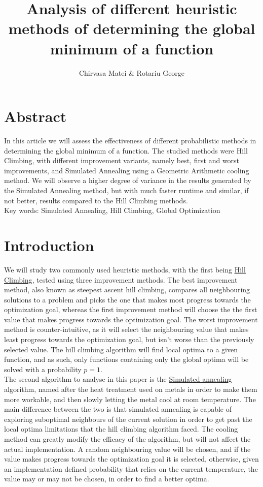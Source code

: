 \documentclass{article}
\author{Chirvasa Matei \& Rotariu George}
\title{Analysis of different heuristic methods of determining the global minimum of a function}
\begin{document}
\maketitle

\section{Abstract}
In this article we will assess the effectiveness of different probabilistic methods in determining the global minimum of a function. The studied methods were Hill Climbing, with different improvement variants, namely best, first and worst improvements, and Simulated Annealing using a Geometric Arithmetic cooling method. We will observe a higher degree of variance in the results generated by the Simulated Annealing method, but with much faster runtime and similar, if not better, results compared to the Hill Climbing methods. \\
Key words: Simulated Annealing, Hill Climbing, Global Optimization

\section{Introduction}
We will study two commonly used heuristic methods, with the first being \underline{\href{https://en.wikipedia.org/wiki/Hill_climbing}{Hill Climbing}}\cite{HC}, tested using three improvement methods. The best improvement method, also known as steepest ascent hill climbing, compares all neighbouring solutions to a problem and picks the one that makes most progress towards the optimization goal, whereas the first improvement method will choose the the first value that makes progress towards the optimization goal. The worst improvement method is counter-intuitive, as it will select the neighbouring value that makes least progress towards the optimization goal, but isn't worse than the previously selected value. The hill climbing algorithm will find local optima to a given function, and as such, only functions containing only the global optima will be solved with a probability $p=1$. \\
The second algorithm to analyse in this paper is the \underline{\href{https://en.wikipedia.org/wiki/Simulated_annealing}{Simulated annealing}}\cite{SA} algorithm, named after the heat treatment used on metals in order to make them more workable, and then slowly letting the metal cool at room temperature. The main difference between the two is that simulated annealing is capable of exploring suboptimal neighbours of the current solution in order to get past the local optima limitations that the hill climbing algorithm faced. The cooling method can greatly modify the efficacy of the algorithm, but will not affect the actual implementation. A random neighbouring value will be chosen, and if the value makes progress towards the optimization goal it is selected, otherwise, given an implementation defined probability that relies on the current temperature, the value may or may not be chosen, in order to find a better optima.
\end{document}
